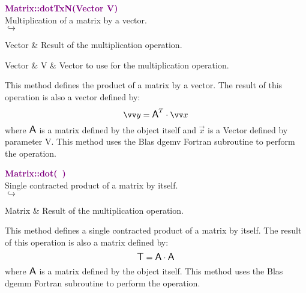 \textcolor{purple}{\textbf{Matrix::dotTxN(Vector V)}}\label{Matrix::dotTxN(Vector V)}\\
Multiplication of a matrix by a vector.\\ \hspace*{5mm}$\hookrightarrow$
\vspace*{-2em}\begin{tcolorbox}[grow to left by=-1cm, width=\textwidth-1cm,myArgs,tabularx={l|R}]
Vector & Result of the multiplication operation.
\end{tcolorbox}

\begin{tcolorbox}[width=\textwidth,myArgs,tabularx={ll|R}]
Vector & V & Vector to use for the multiplication operation.
\end{tcolorbox}

This method defines the product of a matrix by a vector.
The result of this operation is also a vector defined by:
\begin{equation*}
\overrightarrow{y} = \A^T \cdot \overrightarrow{x}
\end{equation*}
where $\mbox{\large\ensuremath{\mathsf{A}}}$ is a matrix defined by the object itself and $\overrightarrow{x}$ is a Vector defined by parameter V.
This method uses the Blas \textsf{dgemv} Fortran subroutine to perform the operation.

\textcolor{purple}{\textbf{Matrix::dot(~)}}\label{Matrix::dot()}\\
Single contracted product of a matrix by itself.\\ \hspace*{5mm}$\hookrightarrow$
\vspace*{-2em}\begin{tcolorbox}[grow to left by=-1cm, width=\textwidth-1cm,myArgs,tabularx={l|R}]
Matrix & Result of the multiplication operation.
\end{tcolorbox}

This method defines a single contracted product of a matrix by itself.
The result of this operation is also a matrix defined by:
\begin{equation*}
\mbox{\large\ensuremath{\mathsf{T}}} = \mbox{\large\ensuremath{\mathsf{A}}} \cdot \mbox{\large\ensuremath{\mathsf{A}}}
\end{equation*}
where $\mbox{\large\ensuremath{\mathsf{A}}}$ is a matrix defined by the object itself.
This method uses the Blas \textsf{dgemm} Fortran subroutine to perform the operation.

